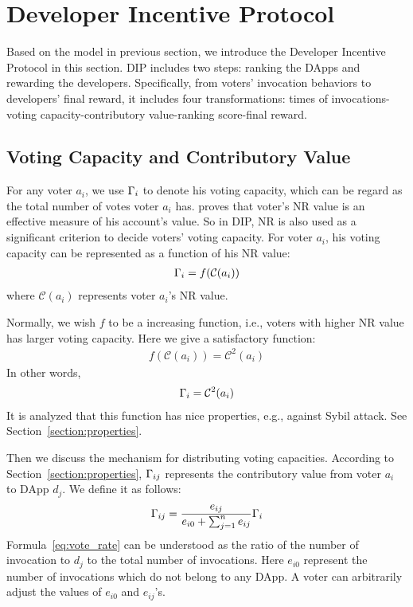 \section{Developer Incentive Protocol}
Based on the model in previous section, we introduce the Developer Incentive Protocol in this section. DIP includes two steps: ranking the DApps and rewarding the developers. Specifically, from voters' invocation behaviors to developers' final reward, it includes four transformations: times of invocations-voting capacity-contributory value-ranking score-final reward. 

\subsection{Voting Capacity and Contributory Value}
For any voter $a_i$, we use $\Gamma_i$ to denote his voting capacity, which can be regard as the total number of votes voter $a_i$ has. \cite{Nebulasyellowpaper} proves that voter's NR value is an effective measure of his account's value. So in DIP, NR is also used as a significant criterion to decide voters' voting capacity. For voter $a_i$, his voting capacity can be represented as a function of his NR value:
\begin{align}
	\Gamma_i = f(\mathcal{C}(a_i))
\end{align}
where $\mathcal{C}(a_i)$ represents voter $a_i$'s NR value.

Normally, we wish $f$ to be a increasing function, i.e., voters with higher NR value has larger voting capacity. Here we give a satisfactory function:
\begin{align}
	f(\mathcal{C}(a_i))=\mathcal{C}^2(a_i)
\end{align}
In other words, 
\begin{align}
	\Gamma_i = \mathcal{C}^2(a_i)
\end{align}
It is analyzed that this function has nice properties, e.g., against Sybil attack. See Section~\ref{section:properties}.

Then we discuss the mechanism for  distributing voting capacities. According to Section~\ref{section:properties}, $\Gamma_{ij}$ represents the contributory value from voter $a_i$ to DApp $d_j$. We define it as follows:
\begin{align}
	\label{eq:vote_rate}
	\Gamma_{ij} = \frac{e_{ij}}{e_{i0}+\sum_{j=1}^n {e_{ij}}} \Gamma_i
\end{align}
Formula~\ref{eq:vote_rate} can be understood as the ratio of the number of invocation to $d_j$ to the total number of invocations. Here $e_{i0}$ represent the number of invocations which do not belong to any DApp. A voter can arbitrarily adjust the values of $e_{i0}$ and $e_{ij}$'s.

